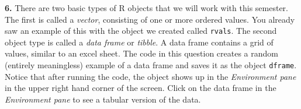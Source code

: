 \documentclass{tufte-handout}
\begin{document}
\bigskip

\textbf{6.} There are two basic types of R objects that we will work with
this semester. The first is called a \textit{vector}, consisting of one or
more ordered values. You already saw an example of this with the object we
created called \texttt{rvals}. The second object type is called a \textit{data
frame} or \textit{tibble}. A data frame contains a grid of values, similar to
an excel sheet. The code in this question creates a random (entirely
meaningless) example of a data frame and saves it as the object
\texttt{dframe}. Notice that after running the code, the object shows up in
the \textit{Environment pane} in the upper right hand corner of the screen.
Click on the data frame in the \textit{Environment pane} to see a tabular
version of the data.
\end{document}
